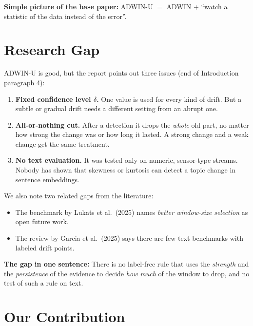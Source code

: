 \documentclass[11pt,a4paper]{article}
\begin{document}
\begin{keybox}
\textbf{Simple picture of the base paper:} ADWIN-U $=$ ADWIN $+$ ``watch a statistic of the data instead of the error''.
\end{keybox}

\section{Research Gap}

ADWIN-U is good, but the report points out three issues (end of Introduction paragraph 4):

\begin{enumerate}
  \item \textbf{Fixed confidence level $\delta$.} One value is used for every kind of drift. But a subtle or gradual drift needs a different setting from an abrupt one.
  \item \textbf{All-or-nothing cut.} After a detection it drops the \emph{whole} old part, no matter how strong the change was or how long it lasted. A strong change and a weak change get the same treatment.
  \item \textbf{No text evaluation.} It was tested only on numeric, sensor-type streams. Nobody has shown that skewness or kurtosis can detect a topic change in sentence embeddings.
\end{enumerate}

We also note two related gaps from the literature:
\begin{itemize}
  \item The benchmark by Lukats et al.\ (2025) names \emph{better window-size selection} as open future work.
  \item The review by Garcia et al.\ (2025) says there are few text benchmarks with labeled drift points.
\end{itemize}

\begin{keybox}
\textbf{The gap in one sentence:} There is no label-free rule that uses the \emph{strength} and the \emph{persistence} of the evidence to decide \emph{how much} of the window to drop, and no test of such a rule on text.
\end{keybox}

\section{Our Contribution}
\end{document}
